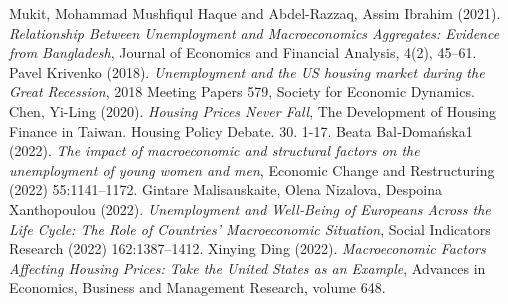 \documentclass[12pt]{article}
\begin{document}
\begin{spacing}{2}
\begin{thebibliography}{1}
    Mukit, Mohammad Mushfiqul Haque and Abdel-Razzaq, Assim Ibrahim (2021). \emph{Relationship Between Unemployment and Macroeconomics Aggregates: Evidence from Bangladesh}, Journal of Economics and Financial Analysis, 4(2), 45–61.
    Pavel Krivenko (2018). \emph{Unemployment and the US housing market during the Great Recession}, 2018 Meeting Papers 579, Society for Economic Dynamics.
    Chen, Yi-Ling (2020). \emph{Housing Prices Never Fall}, The Development of Housing Finance in Taiwan. Housing Policy Debate. 30. 1-17.  
    Beata Bal‐Domańska1 (2022). \emph{The impact of macroeconomic and structural factors on the unemployment of young women and men}, Economic Change and Restructuring (2022) 55:1141–1172.
    Gintare Malisauskaite, Olena Nizalova, Despoina Xanthopoulou (2022). \emph{Unemployment and Well‐Being of Europeans Across the Life Cycle: The Role of Countries’ Macroeconomic Situation}, Social Indicators Research (2022) 162:1387–1412.
    Xinying Ding (2022). \emph{Macroeconomic Factors Affecting Housing Prices: Take the United States as an Example}, Advances in Economics, Business and Management Research, volume 648.
\end{thebibliography}


\end{spacing}
\end{document}
